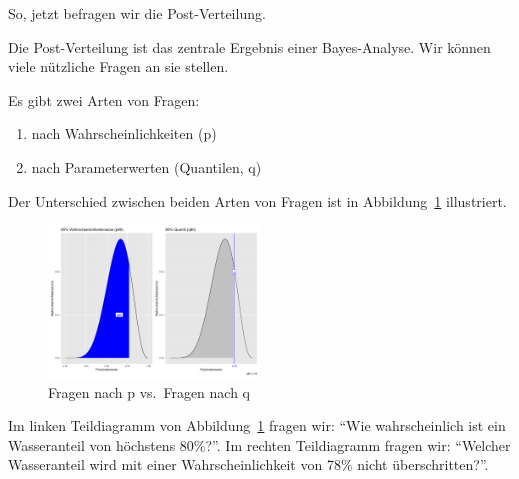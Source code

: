 \documentclass[
  a4paper,
  DIV=11]{scrreprt}
\providecommand{\tightlist}{%
  \setlength{\itemsep}{0pt}\setlength{\parskip}{0pt}}\usepackage{longtable,booktabs,array}
\theoremstyle{definition}
\theoremstyle{remark}
\begin{document}
So, jetzt befragen wir die Post-Verteilung.

\begin{tcolorbox}[enhanced jigsaw, colframe=quarto-callout-important-color-frame, title=\textcolor{quarto-callout-important-color}{\faExclamation}\hspace{0.5em}{Wichtig}, breakable, leftrule=.75mm, coltitle=black, toptitle=1mm, bottomrule=.15mm, bottomtitle=1mm, opacityback=0, arc=.35mm, rightrule=.15mm, left=2mm, colbacktitle=quarto-callout-important-color!10!white, opacitybacktitle=0.6, toprule=.15mm, titlerule=0mm, colback=white]
Die Post-Verteilung ist das zentrale Ergebnis einer Bayes-Analyse. Wir
können viele nützliche Fragen an sie stellen.
\end{tcolorbox}

Es gibt zwei Arten von Fragen:

\begin{enumerate}
\def\labelenumi{\arabic{enumi}.}
\tightlist
\item
  nach Wahrscheinlichkeiten (p)
\item
  nach Parameterwerten (Quantilen, q)
\end{enumerate}

Der Unterschied zwischen beiden Arten von Fragen ist in
Abbildung~\ref{fig-p-vs-q} illustriert.

\begin{figure}

{\centering \includegraphics[width=0.5\textwidth,height=\textheight]{./img/p-vs-q.png}

}

\caption{\label{fig-p-vs-q}Fragen nach p vs.~Fragen nach q}

\end{figure}

Im linken Teildiagramm von Abbildung~\ref{fig-p-vs-q} fragen wir: ``Wie
wahrscheinlich ist ein Wasseranteil von höchstens 80\%?''. Im rechten
Teildiagramm fragen wir: ``Welcher Wasseranteil wird mit einer
Wahrscheinlichkeit von 78\% nicht überschritten?''.
\end{document}
